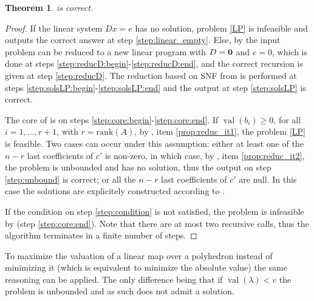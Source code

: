 \documentclass{elsarticle}
\theoremstyle{plain}
\newtheorem{theorem}{Theorem}[section]
\theoremstyle{definition}
\DeclareMathOperator{\val}{val}
\begin{document}
\begin{theorem}  is correct.
\end{theorem}
\begin{proof}
  If the linear system $Dx=e$ has no solution, problem \eqref{LP} is infeasible
  and  outputs the correct answer at step \ref{step:linear_empty}.
  Else, by  the input problem can be reduced to a new linear
  program with $D={\bf 0}$ and $e=0$, which is done at steps
  \ref{step:reducD:begin}-\ref{step:reducD:end},
  and the correct recursion is given at step \ref{step:reducD}.
  The reduction based on SNF from  is performed at
  steps \ref{step:solsLP:begin}-\ref{step:solsLP:end} and the output
  at step \ref{step:solsLP} is correct.
  
  The core of  is on steps \ref{step:core:begin}-\ref{step:core:end}.
  If $\val(b_i) \geq 0$, for all $i=1,\ldots,r+1$, with $r = \mathrm{rank}(A)$,
  by , item \ref{prop:reduc_it1}, the problem \eqref{LP} is feasible.
  Two cases can occur under this assumption:
  either at least one of the $n-r$ last coefficients of $c'$ is non-zero,
  in which case,
  by , item \ref{prop:reduc_it2}, the problem is
  unbounded and has no solution, thus the output on step \ref{step:unbound} is correct;
  or all the $n-r$ last coefficients of $c'$ are null. In this case the solutions
  are explicitely constructed according to .

  If the condition on step \ref{step:condition} is not satisfied, the problem
  is infeasible by  (step \ref{step:core:end}).
  Note that there are at most two recursive calls, thus
  the algorithm terminates in a finite number of steps.
\end{proof}


\begin{remark}
  To maximize the valuation of a linear map over a polyhedron instead of minimizing it 
  (which is equivalent to minimize the absolute value) the same reasoning can be applied. 
  The only difference being that if $\val\left( \lambda\right) < v$ the problem is unbounded
  and as such does not admit a solution. 
\end{remark}
\end{document}
